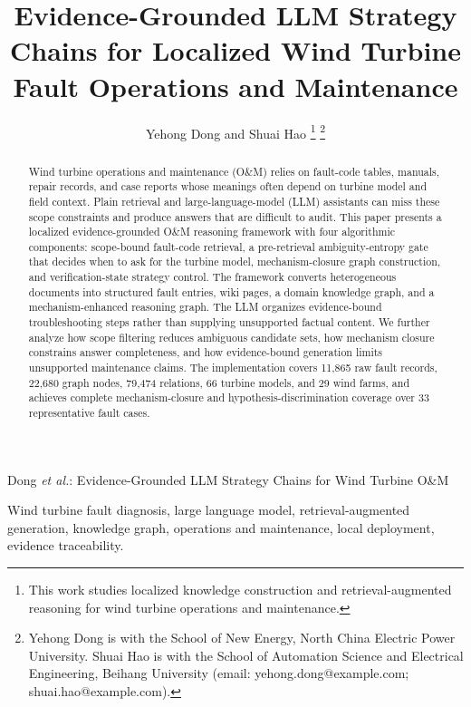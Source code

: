 \documentclass[lettersize,journal]{IEEEtran}
\begin{document}
\title{Evidence-Grounded LLM Strategy Chains for Localized Wind Turbine Fault Operations and Maintenance}

\author{Yehong Dong
        and Shuai Hao
\thanks{This work studies localized knowledge construction and retrieval-augmented reasoning for wind turbine operations and maintenance.}
\thanks{Yehong Dong is with the School of New Energy, North China Electric Power University. Shuai Hao is with the School of Automation Science and Electrical Engineering, Beihang University (email: yehong.dong@example.com; shuai.hao@example.com).}}

%
{Dong \MakeLowercase{\textit{et al.}}: Evidence-Grounded LLM Strategy Chains for Wind Turbine O\&M}

\maketitle

\begin{abstract}
Wind turbine operations and maintenance (O\&M) relies on fault-code tables, manuals, repair records, and case reports whose meanings often depend on turbine model and field context. Plain retrieval and large-language-model (LLM) assistants can miss these scope constraints and produce answers that are difficult to audit. This paper presents a localized evidence-grounded O\&M reasoning framework with four algorithmic components: scope-bound fault-code retrieval, a pre-retrieval ambiguity-entropy gate that decides when to ask for the turbine model, mechanism-closure graph construction, and verification-state strategy control. The framework converts heterogeneous documents into structured fault entries, wiki pages, a domain knowledge graph, and a mechanism-enhanced reasoning graph. The LLM organizes evidence-bound troubleshooting steps rather than supplying unsupported factual content. We further analyze how scope filtering reduces ambiguous candidate sets, how mechanism closure constrains answer completeness, and how evidence-bound generation limits unsupported maintenance claims. The implementation covers 11,865 raw fault records, 22,680 graph nodes, 79,474 relations, 66 turbine models, and 29 wind farms, and achieves complete mechanism-closure and hypothesis-discrimination coverage over 33 representative fault cases.
\end{abstract}

\begin{IEEEkeywords}
Wind turbine fault diagnosis, large language model, retrieval-augmented generation, knowledge graph, operations and maintenance, local deployment, evidence traceability.
\end{IEEEkeywords}
\end{document}
